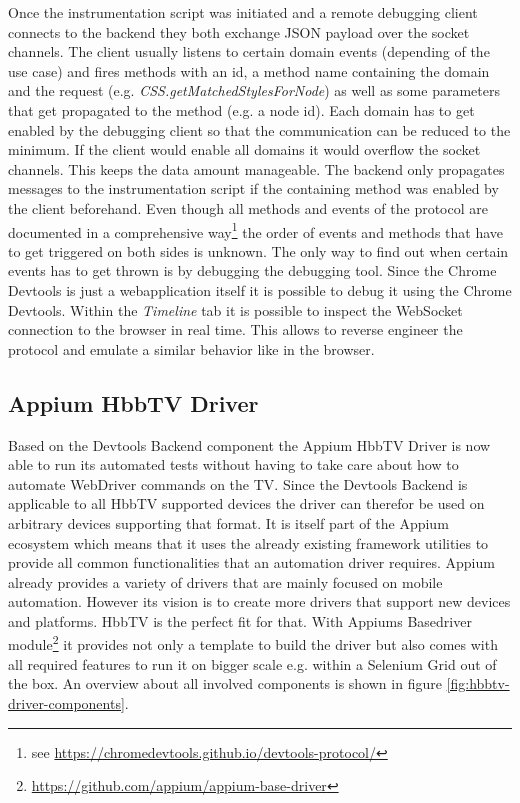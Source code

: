 Once the instrumentation script was initiated and a remote debugging client connects to the backend
they both exchange JSON payload over the socket channels. The client usually listens to certain
domain events (depending of the use case) and fires methods with an id, a method name containing
the domain and the request (e.g. \textit{CSS.getMatchedStylesForNode}) as well as some parameters
that get propagated to the method (e.g. a node id). Each domain has to get enabled by the debugging
client so that the communication can be reduced to the minimum. If the client would enable all
domains it would overflow the socket channels. This keeps the data amount manageable. The backend
only propagates messages to the instrumentation script if the containing method was enabled by
the client beforehand. Even though all methods and events of the protocol are documented in a
comprehensive way\footnote{see \url{https://chromedevtools.github.io/devtools-protocol/}} the order
of events and methods that have to get triggered on both sides is unknown. The only way to find
out when certain events has to get thrown is by debugging the debugging tool. Since the Chrome
Devtools is just a webapplication itself it is possible to debug it using the Chrome Devtools.
Within the \textit{Timeline} tab it is possible to inspect the WebSocket connection to the browser
in real time. This allows to reverse engineer the protocol and emulate a similar behavior like
in the browser.

\subsection{Appium HbbTV Driver\label{sec:appiumhbbtvdriver}}

Based on the Devtools Backend component the Appium HbbTV Driver is now able to run its automated
tests without having to take care about how to automate WebDriver commands on the TV. Since the
Devtools Backend is applicable to all HbbTV supported devices the driver can therefor be used on
arbitrary devices supporting that format. It is itself part of the Appium ecosystem which means
that it uses the already existing framework utilities to provide all common functionalities that
an automation driver requires. Appium already provides a variety of drivers that are mainly
focused on mobile automation. However its vision is to create more drivers that support new devices
and platforms. HbbTV is the perfect fit for that. With Appiums Basedriver module\footnote{\url{https://github.com/appium/appium-base-driver}}
it provides not only a template to build the driver but also comes with all required features to
run it on bigger scale e.g. within a Selenium Grid out of the box. An overview about all involved
components is shown in figure \ref{fig:hbbtv-driver-components}.

